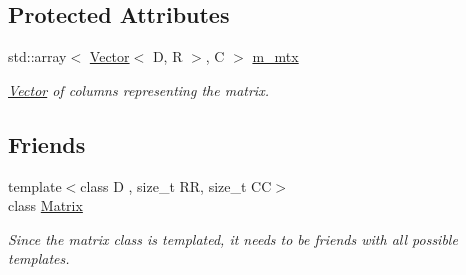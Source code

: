 \subsection*{Protected Attributes}
\begin{DoxyCompactItemize}
\item 
\mbox{\label{classrev_1_1_matrix_a674e074f9ecf2b36d050b51babc3acaf}} 
std\+::array$<$ \mbox{\hyperlink{classrev_1_1_vector}{Vector}}$<$ D, R $>$, C $>$ \mbox{\hyperlink{classrev_1_1_matrix_a674e074f9ecf2b36d050b51babc3acaf}{m\+\_\+mtx}}
\begin{DoxyCompactList}\small\item\em \mbox{\hyperlink{classrev_1_1_vector}{Vector}} of columns representing the matrix. \end{DoxyCompactList}\end{DoxyCompactItemize}
\subsection*{Friends}
\begin{DoxyCompactItemize}
\item 
\mbox{\label{classrev_1_1_matrix_aecc2950843b75b014486ee8d17a5851c}} 
{\footnotesize template$<$class D , size\+\_\+t RR, size\+\_\+t CC$>$ }\\class \mbox{\hyperlink{classrev_1_1_matrix_aecc2950843b75b014486ee8d17a5851c}{Matrix}}
\begin{DoxyCompactList}\small\item\em Since the matrix class is templated, it needs to be friends with all possible templates. \end{DoxyCompactList}\end{DoxyCompactItemize}
